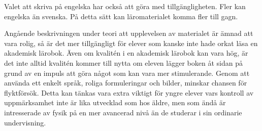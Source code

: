 Valet att skriva på engelska har också att göra med tillgängligheten. Fler kan
engelska än svenska. På detta sätt kan läromaterialet komma fler till gagn.

Angående beskrivningen under teori att upplevelsen av materialet är ämnad att
vara rolig, så är det mer tillgängligt för elever som kanske inte hade orkat
läsa en akademisk lärobok. Även om kvalitén i en akademisk lärobok kan vara hög,
är det inte alltid kvalitén kommer till nytta om eleven lägger boken åt sidan på
grund av en impuls att göra något som kan vara mer stimulerande.  Genom att
använda ett enkelt språk, roliga formuleringar och bilder, minskar chansen för
flyktförsök. Detta kan tänkas vara extra viktigt för yngre elever vars kontroll
av uppmärksamhet inte är lika utvecklad som hos äldre, men som ändå är
intresserade av fysik på en mer avancerad nivå än de studerar i sin ordinarie
undervisning.
